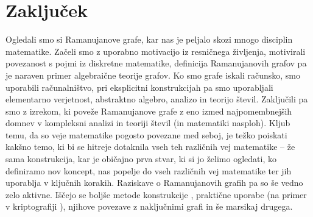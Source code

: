 \section{Zaključek}
Ogledali smo si Ramanujanove grafe, kar nas je peljalo skozi mnogo disciplin matematike. Začeli smo z uporabno motivacijo iz resničnega življenja, motivirali povezanost s pojmi iz diskretne matematike, definicija Ramanujanovih grafov pa je naraven primer algebraične teorije grafov. Ko smo grafe iskali računsko, smo uporabili računalništvo, pri eksplicitni konstrukcijah pa smo uporabljali elementarno verjetnost, abstraktno algebro, analizo in teorijo števil. Zaključili pa smo z izrekom, ki poveže Ramanujanove grafe z eno izmed najpomembnejših domnev v kompleksni analizi in teoriji števil (in matematiki nasploh). Kljub temu, da so veje matematike pogosto povezane med seboj, je težko poiskati kakšno temo, ki bi se hitreje dotaknila vseh teh različnih vej matematike -- že sama konstrukcija, kar je običajno prva stvar, ki si jo želimo ogledati, ko definiramo nov koncept, nas popelje do vseh različnih vej matematike ter jih uporablja v ključnih korakih. Raziskave o Ramanujanovih grafih pa so še vedno zelo aktivne. Iščejo se boljše metode konstrukcije \cite{marcus2015interlacingfamiliesivbipartite}, praktične uporabe (na primer v kriptografiji \cite{10.1007/978-3-030-19478-9_1}), njihove povezave z naključnimi grafi \cite{huang2024ramanujanpropertyedgeuniversality} in še marsikaj drugega. 